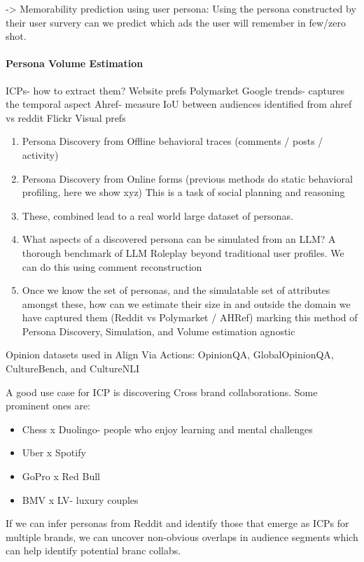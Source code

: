 -> Memorability prediction using user persona: Using the persona constructed by their user survery can we predict which ads the user will remember in few/zero shot.
\paragraph{Persona Volume Estimation}
ICPs- how to extract them?
Website prefs
Polymarket
Google trends- captures the temporal aspect 
Ahref- measure IoU between audiences identified from ahref vs reddit 
Flickr
Visual prefs


\begin{enumerate}
    \item Persona Discovery from Offline behavioral traces (comments / posts / activity)
    \item Persona Discovery from Online forms (previous methods do static behavioral profiling, here we show xyz) This is a task of social planning and reasoning
    \item These, combined lead to a real world large dataset of personas.
    \item What aspects of a discovered persona can be simulated from an LLM? A thorough benchmark of LLM Roleplay beyond traditional user profiles. We can do this using comment reconstruction
    \item Once we know the set of personas, and the simulatable set of attributes amongst these, how can we estimate their size in and outside the domain we have captured them (Reddit vs Polymarket / AHRef) marking this method of Persona Discovery, Simulation, and Volume estimation agnostic
\end{enumerate}


Opinion datasets used in Align Via Actions: OpinionQA, GlobalOpinionQA, CultureBench, and CultureNLI

A good use case for ICP is discovering Cross brand collaborations. Some prominent ones are:
\begin{itemize}
    \item Chess x Duolingo- people who enjoy learning and mental challenges
    \item Uber x Spotify
    \item GoPro x Red Bull
    \item BMV x LV- luxury couples
\end{itemize}
If we can infer personas from Reddit and identify those that emerge as ICPs for multiple brands, we can uncover non-obvious overlaps in audience segments which can help identify potential branc collabs.



